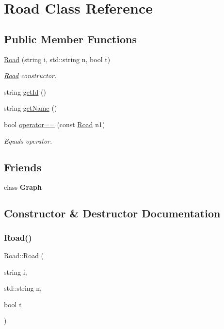 \hypertarget{class_road}{}\section{Road Class Reference}
\label{class_road}
\subsection*{Public Member Functions}
\begin{DoxyCompactItemize}
\item 
\mbox{\hyperlink{class_road_a0601050b40450e326cb69d8cdf6ce241}{Road}} (string i, std\+::string n, bool t)
\begin{DoxyCompactList}\small\item\em \mbox{\hyperlink{class_road}{Road}} constructor. \end{DoxyCompactList}\item 
string \mbox{\hyperlink{class_road_ab268fec324a9eb2ef3cb2c775f82c914}{get\+Id}} ()
\item 
string \mbox{\hyperlink{class_road_a900c77eae1c7adc71f2a0a4afd2fb904}{get\+Name}} ()
\item 
bool \mbox{\hyperlink{class_road_aafdb4cdefbf04343e8a7f55c5d7c0c49}{operator==}} (const \mbox{\hyperlink{class_road}{Road}} n1)
\begin{DoxyCompactList}\small\item\em Equals operator. \end{DoxyCompactList}\end{DoxyCompactItemize}
\subsection*{Friends}
\begin{DoxyCompactItemize}
\item 
\mbox{\label{class_road_afab89afd724f1b07b1aaad6bdc61c47a}} 
class {\bfseries Graph}
\end{DoxyCompactItemize}


\subsection{Constructor \& Destructor Documentation}
\mbox{\label{class_road_a0601050b40450e326cb69d8cdf6ce241}} 
\subsubsection{\texorpdfstring{Road()}{Road()}}
{\footnotesize\ttfamily Road\+::\+Road (\begin{DoxyParamCaption}\item[{string}]{i,  }\item[{std\+::string}]{n,  }\item[{bool}]{t }\end{DoxyParamCaption})\hspace{0.3cm}{\ttfamily [inline]}}



